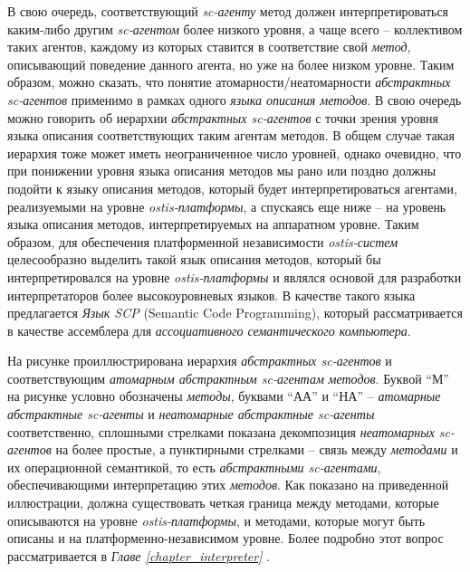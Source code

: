 \begin{textitemize}
	\item В свою очередь, соответствующий \textit{sc-агенту} метод должен интерпретироваться каким-либо другим \textit{sc-агентом} более низкого уровня, а чаще всего -- коллективом таких агентов, каждому из которых ставится в соответствие свой \textit{метод}, описывающий поведение данного агента, но уже на более низком уровне. Таким образом, можно сказать, что понятие атомарности/неатомарности \textit{абстрактных sc-агентов} применимо в рамках одного \textit{языка описания методов}. В свою очередь можно говорить об иерархии \textit{абстрактных sc-агентов} с точки зрения уровня языка описания соответствующих таким агентам методов. В общем случае такая иерархия тоже может иметь неограниченное число уровней, однако очевидно, что при понижении уровня языка описания методов мы рано или поздно должны подойти к языку описания методов, который будет интерпретироваться агентами, реализуемыми на уровне \textit{ostis-платформы}, а спускаясь еще ниже -- на уровень языка описания методов, интерпретируемых на аппаратном уровне. Таким образом, для обеспечения платформенной независимости \textit{ostis-систем} целесообразно выделить такой язык описания методов, который бы интерпретировался на уровне \textit{ostis-платформы} и являлся основой для разработки интерпретаторов более высокоуровневых языков. В качестве такого языка предлагается \textit{Язык SCP} (Semantic Code Programming), который рассматривается в качестве ассемблера для \textit{ассоциативного семантического компьютера}.
\end{textitemize}


На рисунке \textit{} проиллюстрирована иерархия \textit{абстрактных sc-агентов} и соответствующим \textit{атомарным абстрактным sc-агентам} \textit{методов}. Буквой ``М'' на рисунке условно обозначены \textit{методы}, буквами ``АА'' и ``НА'' -- \textit{атомарные абстрактные sc-агенты} и \textit{неатомарные абстрактные sc-агенты} соответственно, сплошными стрелками показана декомпозиция \textit{неатомарных sc-агентов} на более простые, а пунктирными стрелками -- связь между \textit{методами} и их операционной семантикой, то есть \textit{абстрактными sc-агентами}, обеспечивающими интерпретацию этих \textit{методов}. Как показано на приведенной иллюстрации, должна существовать четкая граница между методами, которые описываются на уровне \textit{ostis-платформы}, и методами, которые могут быть описаны и на платформенно-независимом уровне. Более подробно этот вопрос рассматривается в \textit{Главе \ref{chapter_interpreter} }.

